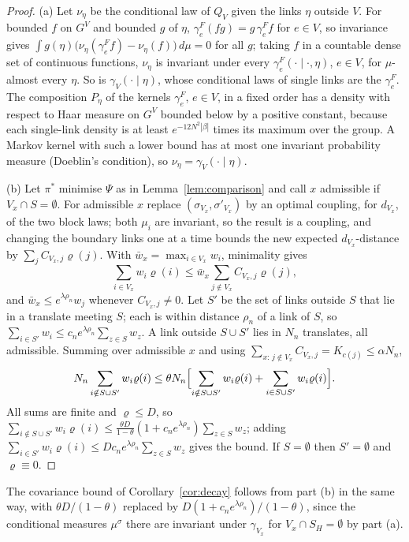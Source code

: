 \documentclass[aps,prd,twocolumn,superscriptaddress,nofootinbib,longbibliography,floatfix,amsmath,amssymb,10pt]{revtex4-2}
\theoremstyle{definition}
\theoremstyle{remark}
\begin{document}
\begin{proof}
(a) Let $\nu_\eta$ be the conditional law of $Q_V$ given the links $\eta$
outside $V$. For bounded $f$ on $G^V$ and bounded $g$ of $\eta$,
$\gamma^F_e(fg)=g\,\gamma^F_ef$ for $e\in V$, so invariance gives $\int
g(\eta)\bigl(\nu_\eta(\gamma^F_ef)-\nu_\eta(f)\bigr)\,d\mu=0$ for all $g$;
taking $f$ in a countable dense set of continuous functions, $\nu_\eta$ is
invariant under every $\gamma^F_e(\cdot\mid\cdot,\eta)$, $e\in V$, for
$\mu$-almost every $\eta$. So is $\gamma_V(\cdot\mid\eta)$, whose
conditional laws of single links are the $\gamma^F_e$. The composition $P_\eta$
of the kernels $\gamma^F_e$, $e\in V$, in a fixed order has a density with
respect to Haar measure on $G^V$ bounded below by a positive constant,
because each single-link density is at least $e^{-12N^2|\beta|}$ times its
maximum over the group. A Markov kernel with such a lower bound has at most
one invariant probability measure (Doeblin's condition), so
$\nu_\eta=\gamma_V(\cdot\mid\eta)$.

(b) Let $\pi^*$ minimise $\Psi$ as in Lemma~\ref{lem:comparison} and call $x$
admissible if $V_x\cap S=\emptyset$. For admissible $x$ replace
$(\sigma_{V_x},\sigma'_{V_x})$ by an optimal coupling, for $d_{V_x}$, of the
two block laws; both $\mu_i$ are invariant, so the result is a coupling, and
changing the boundary links one at a time bounds the new expected
$d_{V_x}$-distance by $\sum_jC_{V_x,j}\varrho(j)$. With $\bar w_x=\max_{i\in
V_x}w_i$, minimality gives
\[
\sum_{i\in V_x}w_i\varrho(i)\le\bar w_x\sum_{j\notin V_x}C_{V_x,j}\varrho(j),
\]
and $\bar w_x\le e^{\lambda\rho_n}w_j$ whenever $C_{V_x,j}\ne0$. Let $S'$ be
the set of links outside $S$ that lie in a translate meeting $S$; each is
within distance $\rho_n$ of a link of $S$, so $\sum_{i\in S'}w_i\le
c_ne^{\lambda\rho_n}\sum_{z\in S}w_z$. A link outside $S\cup S'$ lies in
$N_n$ translates, all admissible. Summing over admissible $x$ and using
$\sum_{x:\,j\notin V_x}C_{V_x,j}=K_{c(j)}\le\alpha N_n$,
\[
N_n\sum_{i\notin S\cup S'}w_i\varrho(i)\le\theta N_n\Bigl[\sum_{i\notin
S\cup S'}w_i\varrho(i)+\sum_{i\in S\cup S'}w_i\varrho(i)\Bigr].
\]
All sums are finite and $\varrho\le D$, so $\sum_{i\notin S\cup S'}w_i
\varrho(i)\le\frac{\theta D}{1-\theta}(1+c_ne^{\lambda\rho_n})\sum_{z\in S}
w_z$; adding $\sum_{i\in S'}w_i\varrho(i)\le Dc_ne^{\lambda\rho_n}\sum_{z\in
S}w_z$ gives the bound. If $S=\emptyset$ then $S'=\emptyset$ and
$\varrho\equiv0$.
\end{proof}

The covariance bound of Corollary~\ref{cor:decay} follows from part (b) in
the same way, with $\theta D/(1-\theta)$ replaced by
$D(1+c_ne^{\lambda\rho_n})/(1-\theta)$, since the conditional measures
$\mu^\sigma$ there are invariant under $\gamma_{V_x}$ for $V_x\cap
S_H=\emptyset$ by part (a).
\end{document}
